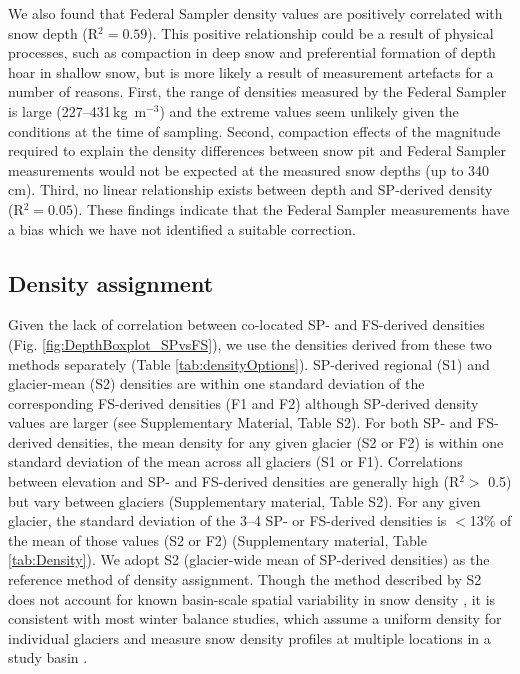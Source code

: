 \documentclass[review,oneside, letterpaper]{igs}
\begin{document}
We also found that Federal Sampler density values are positively correlated with snow depth (R$^2= 0.59$). This positive relationship could be a result of physical processes, such as compaction in deep snow and preferential formation of depth hoar in shallow snow, but is more likely a result of measurement artefacts for a number of reasons. First, the range of densities measured by the Federal Sampler is large (227--431\,kg\, m$^{-3}$) and the extreme values seem unlikely given the conditions at the time of sampling. Second, compaction effects of the magnitude required to explain the density differences between snow pit and Federal Sampler measurements would not be expected at the measured snow depths (up to 340\,cm). Third, no linear relationship exists between depth and SP-derived density (R$^2 = 0.05$). These findings indicate that the Federal Sampler measurements have a bias which we have not identified a suitable correction.

\subsection{Density assignment}

Given the lack of correlation between co-located SP- and FS-derived densities (Fig. \ref{fig:DepthBoxplot_SPvsFS}), we use the densities derived from these two methods separately (Table \ref{tab:densityOptions}). SP-derived regional (S1) and glacier-mean (S2) densities are within one standard deviation of the corresponding FS-derived densities (F1 and F2) although SP-derived density values are larger (see Supplementary Material, Table S2). For both SP- and FS-derived densities, the mean density for any given glacier (S2 or F2) is within one standard deviation of the mean across all glaciers (S1 or F1). Correlations between elevation and SP- and FS-derived densities are generally high (R$^2>$ 0.5) but vary between glaciers (Supplementary material, Table S2). For any given glacier, the standard deviation of the 3--4 SP- or FS-derived densities is $<$13\% of the mean of those values (S2 or F2) (Supplementary material, Table \ref{tab:Density}). We adopt S2 (glacier-wide mean of SP-derived densities) as the reference method of density assignment. Though the method described by S2 does not account for known basin-scale spatial variability in snow density \citep[e.g.][]{Wetlaufer2016}, it is consistent with most winter balance studies, which assume a uniform density for individual glaciers and measure snow density profiles at multiple locations in a study basin \citep[e.g.][]{Elder1991,McGrath2015,Cullen2017}. 
\end{document}
